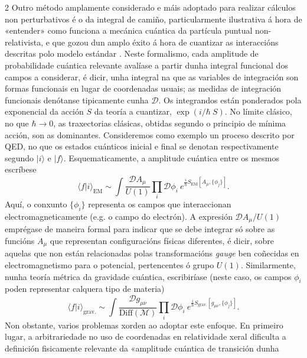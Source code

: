 \begin{multicols}{2}
Outro método amplamente considerado e máis adoptado para realizar cálculos non
perturbativos é o da integral de camiño, particularmente ilustrativa á hora de
«entender» como funciona a mecánica cuántica da partícula puntual
non-relativista, e que gozou dun amplo éxito á hora de cuantizar as
interaccións descritas polo modelo estándar \cite{FH}. Neste formalismo, cada
amplitude de probabilidade cuántica relevante avalíase a partir dunha
integral funcional dos campos a considerar, é dicir, unha integral na que as
variables de integración son formas funcionais en lugar de coordenadas usuais;
as medidas de integración funcionais denótanse tipicamente cunha
$\mathcal{D}$. Os integrandos están ponderados pola exponencial da acción $S$
da teoría a cuantizar, $\exp(i / \hbar ~ S)$. No límite clásico, no que $\hbar
\to 0$, as traxectorias clásicas, obtidas segundo o principio de mínima
acción, son as dominantes. Consideremos como exemplo un proceso descrito por
QED, no que os estados cuánticos inicial e final se denotan respectivamente
segundo $|i\rangle$ e $|f\rangle$. Esquematicamente, a amplitude cuántica entre
os mesmos escríbese
%
\begin{equation}
    \langle f|i\rangle_\text{EM} \sim \int
    \frac{\mathcal{D}A_\mu}{U(1)} \prod_i \mathcal{D}\phi_i ~
    e^{\frac{i}{\hbar}S_\text{EM}[A_\mu, \{\phi_j\}]}.
    \label{eq:PI_form}
\end{equation}
%
Aquí, o conxunto $\{\phi_i\}$ representa os campos que interaccionan
electromagneticamente (e.g. o campo do electrón). A
expresión $\mathcal{D}A_\mu/U(1)$ emprégase de maneira formal para
indicar que se debe integrar só sobre as funcións $A_\mu$ que
representan configuracións físicas diferentes, é dicir, sobre aquelas
que non están relacionadas polas transformacións \textit{gauge} ben
coñecidas en electromagnetismo para o potencial, pertencentes ó grupo
$U(1)$. Similarmente, nunha teoría métrica da gravidade cuántica,
escribiríase (neste caso, os campos $\phi_i$ poden representar
calquera tipo de materia)
%
\begin{equation}
    \langle f|i\rangle_\text{grav.} \sim \int \frac{\mathcal{D}g_{\mu
    \nu}}{\text{Diff}(\mathcal{M})} \prod_i \mathcal{D}\phi_i ~
    e^{\frac{i}{\hbar}S_\text{grav.}[g_{\mu \nu}, \{\phi_j\}]}.
    \label{eq:PI_form_2}
\end{equation}
%
Non obstante, varios problemas xorden ao adoptar este enfoque. En primeiro
lugar, a arbitrariedade no uso de coordenadas en relatividade xeral dificulta a
definición fisicamente relevante da «amplitude cuántica de transición dunha

\end{multicols}
